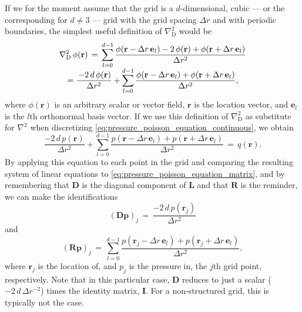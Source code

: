 If we for the moment assume that the grid is a $d$-dimensional, cubic --- or the corresponding for $d \neq 3$ --- grid with the grid spacing $\Delta r$ and with periodic boundaries, the simplest useful definition of $\nabla^2_{\text{D}}$ would be
%
\begin{equation} \label{eq:grid_jacobian_simple}
\renewcommand*{\arraystretch}{2} 
\begin{array}{c}
\displaystyle \nabla^2_{\text{D}}\,\phi(\mathbf{r}) \,=\, \sum_{l=0}^{d-1} \frac{\phi(\mathbf{r}-\Delta r\,\mathbf{e}_l)-2\,\phi(\mathbf{r})+\phi(\mathbf{r}+\Delta r\,\mathbf{e}_l)}{\Delta r^2} \\
\displaystyle =\frac{\,-2\,d\,\phi(\mathbf{r})}{\Delta r^2}+\sum_{l=0}^{d-1} \frac{\phi(\mathbf{r}-\Delta r\,\mathbf{e}_l)+\phi(\mathbf{r}+\Delta r\,\mathbf{e}_l)}{\Delta r^2},
\end{array}
\end{equation}
%
where $\phi(\mathbf{r})$ is an arbitrary scalar or vector field, $\mathbf{r}$ is the location vector, and $\mathbf{e}_l$ is the $l$th orthonormal basis vector. If we use this definition of $\nabla^2_{\text{D}}$ as substitute for $\nabla^2$ when discretizing \eqref{eq:pressure_poisson_equation_continuous}, we obtain
%
\begin{equation} \label{eq:pressure_poisson_equation_discretized}
\frac{-2\,d\,p(\mathbf{r})}{\Delta r^2}+\sum_{l=0}^{d-1} \frac{p(\mathbf{r}-\Delta r\,\mathbf{e}_l)+p(\mathbf{r}+\Delta r\,\mathbf{e}_l)}{\Delta r^2} \,=\, q(\mathbf{r}).
\end{equation}
%
By applying this equation to each point in the grid and comparing the resulting system of linear equations to \eqref{eq:pressure_poisson_equation_matrix}, and by remembering that $\mathbf{D}$ is the diagonal component of $\mathbf{L}$ and that $\mathbf{R}$ is the reminder, we can make the identifications
%
\begin{equation} \label{eq:diagonal_matrix_structured_grid}
(\mathbf{D}\mathbf{p})_j \,=\, \frac{-2\,d\,p(\mathbf{r}_j)}{\Delta r^2} %
\end{equation}
%
and
%
\begin{equation} \label{eq:reminder_matrix_structured_grid}
(\mathbf{R}\mathbf{p})_j \,=\, \sum_{l=0}^{d-1} \frac{p(\mathbf{r}_j-\Delta r\,\mathbf{e}_l)+p(\mathbf{r}_j+\Delta r\,\mathbf{e}_l)}{\Delta r^2},
\end{equation}
%
where $\mathbf{r}_j$ is the location of, and $p_j$ is the pressure in, the $j$th grid point, respectively. Note that in this particular case, $\mathbf{D}$ reduces to just a scalar ($-2\,d\,\Delta r^{-2}$) times the identity matrix, $\mathbf{I}$. For a non-structured grid, this is typically not the case.

